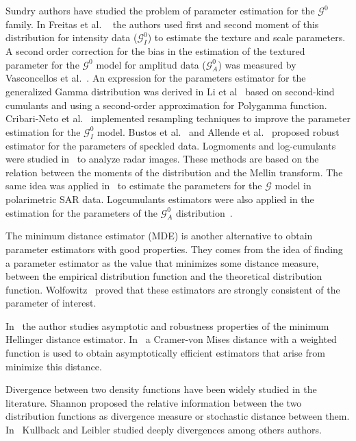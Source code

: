 \documentclass[journal]{IEEEtran}
\numberwithin{equation}{section}
\begin{document}
Sundry authors have studied the problem of parameter estimation for the $\mathcal G^0$ family. In Freitas et al. ~\cite{Freitas2005} the authors used first and second moment of this distribution for intensity data ($\mathcal G_I^0$) to estimate the texture and scale parameters. A second order correction for the bias in the estimation of the textured parameter for the $\mathcal G^0$ model for amplitud data ($\mathcal G_A^0$) was measured by Vasconcellos et al.~\cite{VasconcellosFrerySilva:CompStat}.  An  expression for the parameters estimator for the generalized Gamma distribution was derived in Li et al~\cite{Li2011} based on second-kind cumulants and using a second-order approximation  for  Polygamma  function. Cribari-Neto et al.~\cite{CribariFrerySilva:CSDA} implemented resampling techniques to improve the parameter estimation for the $\mathcal G_I^0$ model. Bustos et al.~\cite{BustosFreryLucini:Mestimators:2001} and Allende et al.~\cite{AllendeFreryetal:JSCS:05} proposed robust estimator for the parameters of speckled data. Logmoments and log-cumulants were studied in~\cite{nicolas2002} to analyze radar images. These methods are based on the relation between the moments of the distribution and the Mellin transform. The same idea was applied in~\cite{khan2014} to estimate the parameters for the $\mathcal{G}$ model in polarimetric SAR data. Logcumulants estimators were also applied in the estimation for the parameters of the $\mathcal G_A^0$ distribution~\cite{Tison2004}. 

The minimum distance estimator (MDE) is another alternative to obtain parameter estimators with good properties. They comes from the idea of finding a parameter estimator as the value that minimizes some  distance measure, between the empirical  distribution function and  the  theoretical distribution function. Wolfowitz~\cite{wolfowitz1953,wolfowitz1957} proved that these estimators are strongly consistent of the parameter of interest.

In~\cite{beran1977} the author studies asymptotic and robustness properties of the minimum Hellinger distance estimator. In~\cite{Boos1981} a Cramer-von Mises distance with a weighted function is used to obtain asymptotically efficient estimators that arise from minimize this distance.

Divergence between two density functions have been widely studied in the literature. Shannon proposed the relative information between the
two distribution functions as divergence measure or stochastic distance between them. In~\cite{KullbackBook1968,KullbackLeibler1951} Kullback and Leibler studied deeply divergences among others authors. 
\end{document}
